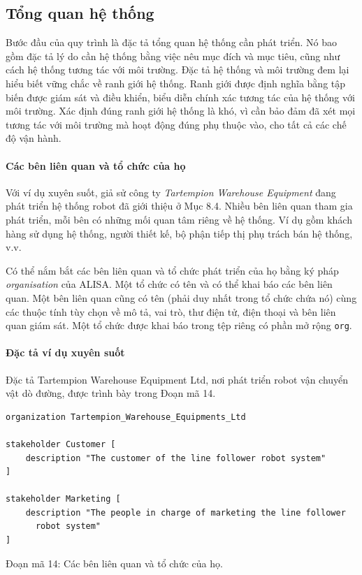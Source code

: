 
\subsection{Tổng quan hệ thống}
Bước đầu của quy trình là đặc tả tổng quan hệ thống cần phát triển. Nó bao gồm đặc tả lý do cần hệ thống bằng việc nêu mục đích và mục tiêu, cũng như cách hệ thống tương tác với môi trường. Đặc tả hệ thống và môi trường đem lại hiểu biết vững chắc về ranh giới hệ thống. Ranh giới được định nghĩa bằng tập biến được giám sát và điều khiển, biểu diễn chính xác tương tác của hệ thống với môi trường. Xác định đúng ranh giới hệ thống là khó, vì cần bảo đảm đã xét mọi tương tác với môi trường mà hoạt động đúng phụ thuộc vào, cho tất cả các chế độ vận hành.

\paragraph*{Các bên liên quan và tổ chức của họ}
Với ví dụ xuyên suốt, giả sử công ty \emph{Tartempion Warehouse Equipment} đang phát triển hệ thống robot đã giới thiệu ở Mục 8.4. Nhiều bên liên quan tham gia phát triển, mỗi bên có những mối quan tâm riêng về hệ thống. Ví dụ gồm khách hàng sử dụng hệ thống, người thiết kế, bộ phận tiếp thị phụ trách bán hệ thống, v.v.

Có thể nắm bắt các bên liên quan và tổ chức phát triển của họ bằng ký pháp \emph{organisation} của ALISA. Một tổ chức có tên và có thể khai báo các bên liên quan. Một bên liên quan cũng có tên (phải duy nhất trong tổ chức chứa nó) cùng các thuộc tính tùy chọn về mô tả, vai trò, thư điện tử, điện thoại và bên liên quan giám sát. Một tổ chức được khai báo trong tệp riêng có phần mở rộng \texttt{org}.

\paragraph*{Đặc tả ví dụ xuyên suốt}
Đặc tả Tartempion Warehouse Equipment Ltd, nơi phát triển robot vận chuyển vật dò đường, được trình bày trong Đoạn mã 14.
\begin{verbatim}
organization Tartempion_Warehouse_Equipments_Ltd

stakeholder Customer [
    description "The customer of the line follower robot system"
]

stakeholder Marketing [
    description "The people in charge of marketing the line follower
      robot system"
]
\end{verbatim}
\begin{center}\small Đoạn mã 14: Các bên liên quan và tổ chức của họ.\end{center}

